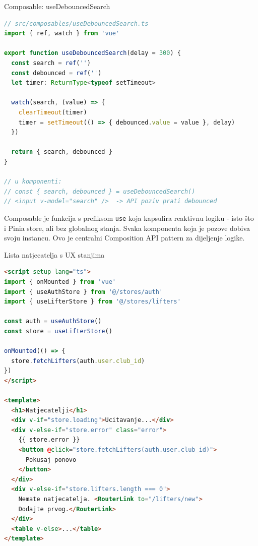 \begin{frame}[fragile,shrink=5]{Composable: useDebouncedSearch}
\begin{lstlisting}[language=typescript]
// src/composables/useDebouncedSearch.ts
import { ref, watch } from 'vue'

export function useDebouncedSearch(delay = 300) {
  const search = ref('')
  const debounced = ref('')
  let timer: ReturnType<typeof setTimeout>

  watch(search, (value) => {
    clearTimeout(timer)
    timer = setTimeout(() => { debounced.value = value }, delay)
  })

  return { search, debounced }
}

// u komponenti:
// const { search, debounced } = useDebouncedSearch()
// <input v-model="search" />  -> API poziv prati debounced
\end{lstlisting}

\vspace{0.4em}
Composable je funkcija s prefiksom \texttt{use} koja kapsulira reaktivnu logiku - isto što i Pinia store, ali bez globalnog stanja. Svaka komponenta koja je pozove dobiva svoju instancu. Ovo je centralni Composition API pattern za dijeljenje logike.
\end{frame}

\begin{frame}[fragile,shrink=5]{Lista natjecatelja s UX stanjima}
\begin{lstlisting}[language=html]
<script setup lang="ts">
import { onMounted } from 'vue'
import { useAuthStore } from '@/stores/auth'
import { useLifterStore } from '@/stores/lifters'

const auth = useAuthStore()
const store = useLifterStore()

onMounted(() => {
  store.fetchLifters(auth.user.club_id)
})
</script>

<template>
  <h1>Natjecatelji</h1>
  <div v-if="store.loading">Ucitavanje...</div>
  <div v-else-if="store.error" class="error">
    {{ store.error }}
    <button @click="store.fetchLifters(auth.user.club_id)">
      Pokusaj ponovo
    </button>
  </div>
  <div v-else-if="store.lifters.length === 0">
    Nemate natjecatelja. <RouterLink to="/lifters/new">
    Dodajte prvog.</RouterLink>
  </div>
  <table v-else>...</table>
</template>
\end{lstlisting}
\end{frame}

